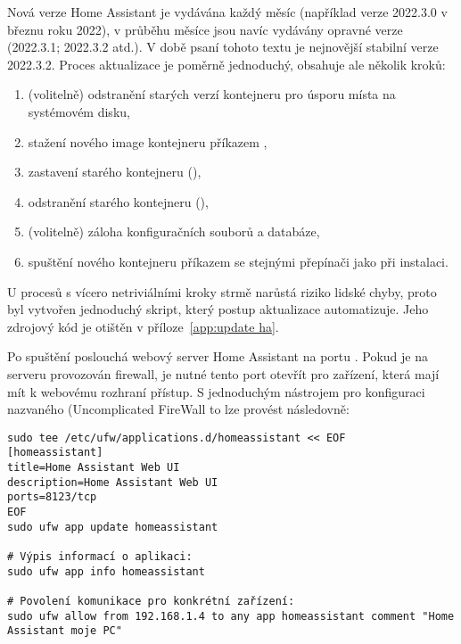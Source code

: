 Nová verze Home Assistant je vydávána každý měsíc (například verze 2022.3.0
v březnu roku 2022), v průběhu měsíce jsou navíc vydávány opravné verze
(2022.3.1; 2022.3.2 atd.). V době psaní tohoto textu je nejnovější stabilní
verze 2022.3.2.
Proces aktualizace je poměrně jednoduchý, obsahuje ale několik kroků:
\begin{enumerate}[nosep]
    \item (volitelně) odstranění starých verzí kontejneru pro úsporu místa na
        systémovém disku,

    \item stažení nového image kontejneru příkazem ,

    \item zastavení starého kontejneru (),

    \item odstranění starého kontejneru (),

    \item (volitelně) záloha konfiguračních souborů a databáze,

    \item spuštění nového kontejneru příkazem  se stejnými
        přepínači jako při instalaci.
\end{enumerate}
U procesů s vícero netriviálními kroky strmě narůstá riziko lidské chyby,
proto byl vytvořen jednoduchý skript, který postup aktualizace automatizuje.
Jeho zdrojový kód je otištěn v příloze~\vref{app:update ha}.

Po spuštění poslouchá webový server Home Assistant na portu .
Pokud je na serveru provozován firewall, je nutné tento port otevřít pro
zařízení, která mají mít k webovému rozhraní přístup. S jednoduchým nástrojem
pro konfiguraci  nazvaného 
(\foreignlanguage{english}{Uncomplicated FireWall} to lze provést následovně:
\begin{lstlisting}[language=mybash]
sudo tee /etc/ufw/applications.d/homeassistant << EOF
[homeassistant]
title=Home Assistant Web UI
description=Home Assistant Web UI
ports=8123/tcp
EOF
sudo ufw app update homeassistant

# Výpis informací o aplikaci:
sudo ufw app info homeassistant

# Povolení komunikace pro konkrétní zařízení:
sudo ufw allow from 192.168.1.4 to any app homeassistant comment "Home Assistant moje PC"
\end{lstlisting}


